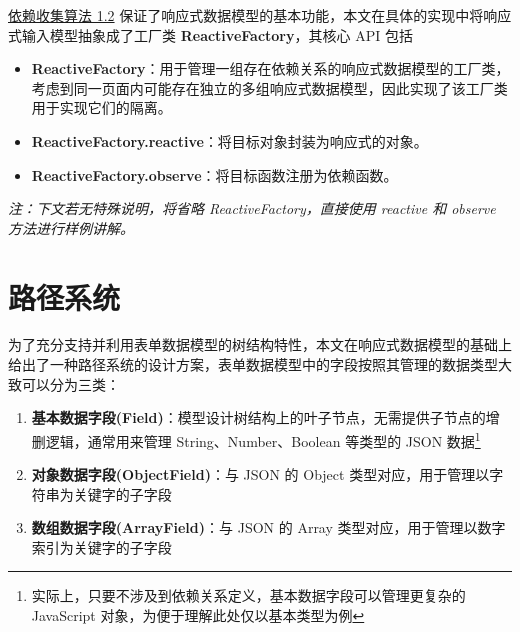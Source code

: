 \documentclass[winfonts,master,twoside]{njuthesis}
\begin{document}
\hyperref[dependency-collect-algorithm-1.2]{依赖收集算法 1.2} 保证了响应式数据模型的基本功能，本文在具体的实现中将响应式输入模型抽象成了工厂类 \textbf{ReactiveFactory}，其核心 API 包括

\begin{itemize}
    \item \textbf{ReactiveFactory}：用于管理一组存在依赖关系的响应式数据模型的工厂类，考虑到同一页面内可能存在独立的多组响应式数据模型，因此实现了该工厂类用于实现它们的隔离。
    \item \textbf{ReactiveFactory.reactive}：将目标对象封装为响应式的对象。
    \item \textbf{ReactiveFactory.observe}：将目标函数注册为依赖函数。
\end{itemize}

\begin{center}
    \begin{minipage}{0.3\textwidth}
        
    \end{minipage}\quad
    \begin{minipage}{0.3\textwidth}
        
    \end{minipage}\quad
    \begin{minipage}{0.3\textwidth}
        
    \end{minipage}
\end{center}

\textit{注：下文若无特殊说明，将省略 ReactiveFactory，直接使用 reactive 和 observe 方法进行样例讲解。}

\section{路径系统}

为了充分支持并利用表单数据模型的树结构特性，本文在响应式数据模型的基础上给出了一种路径系统的设计方案，表单数据模型中的字段按照其管理的数据类型大致可以分为三类：

\begin{enumerate}
    \item \textbf{基本数据字段(Field)}：模型设计树结构上的叶子节点，无需提供子节点的增删逻辑，通常用来管理 String、Number、Boolean 等类型的 JSON 数据\footnote{实际上，只要不涉及到依赖关系定义，基本数据字段可以管理更复杂的 JavaScript 对象，为便于理解此处仅以基本类型为例}
    \item \textbf{对象数据字段(ObjectField)}：与 JSON 的 Object 类型对应，用于管理以字符串为关键字的子字段
    \item \textbf{数组数据字段(ArrayField)}：与 JSON 的 Array 类型对应，用于管理以数字索引为关键字的子字段
\end{enumerate}
\end{document}
